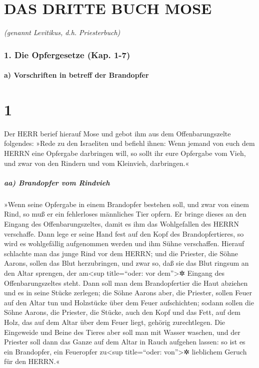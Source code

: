 \hypertarget{das-dritte-buch-mose}{%
\section{DAS DRITTE BUCH MOSE}\label{das-dritte-buch-mose}}

\emph{(genannt Levitikus, d.h. Priesterbuch)}

\hypertarget{die-opfergesetze-kap.-1-7}{%
\subsubsection{1. Die Opfergesetze (Kap.
1-7)}\label{die-opfergesetze-kap.-1-7}}

\hypertarget{a-vorschriften-in-betreff-der-brandopfer}{%
\paragraph{a) Vorschriften in betreff der
Brandopfer}\label{a-vorschriften-in-betreff-der-brandopfer}}

\hypertarget{section}{%
\section{1}\label{section}}

Der HERR berief hierauf Mose und gebot ihm aus dem
Offenbarungszelte folgendes: »Rede zu den Israeliten und
befiehl ihnen: Wenn jemand von euch dem HERRN eine Opfergabe darbringen
will, so sollt ihr eure Opfergabe vom Vieh, und zwar von den Rindern und
vom Kleinvieh, darbringen.«

\hypertarget{aa-brandopfer-vom-rindvieh}{%
\subparagraph{aa) Brandopfer vom
Rindvieh}\label{aa-brandopfer-vom-rindvieh}}

»Wenn seine Opfergabe in einem Brandopfer bestehen soll,
und zwar von einem Rind, so muß er ein fehlerloses männliches Tier
opfern. Er bringe dieses an den Eingang des Offenbarungszeltes, damit es
ihm das Wohlgefallen des HERRN verschaffe. Dann lege er
seine Hand fest auf den Kopf des Brandopfertieres, so wird es
wohlgefällig aufgenommen werden und ihm Sühne verschaffen.
Hierauf schlachte man das junge Rind vor dem HERRN; und
die Priester, die Söhne Aarons, sollen das Blut herzubringen, und zwar
so, daß sie das Blut ringsum an den Altar sprengen, der am\textless sup
title=``oder: vor dem''\textgreater✲ Eingang des Offenbarungszeltes
steht. Dann soll man dem Brandopfertier die Haut abziehen
und es in seine Stücke zerlegen; die Söhne Aarons aber,
die Priester, sollen Feuer auf den Altar tun und Holzstücke über dem
Feuer aufschichten; sodann sollen die Söhne Aarons, die
Priester, die Stücke, auch den Kopf und das Fett, auf dem Holz, das auf
dem Altar über dem Feuer liegt, gehörig zurechtlegen. Die
Eingeweide und Beine des Tieres aber soll man mit Wasser waschen, und
der Priester soll dann das Ganze auf dem Altar in Rauch aufgehen lassen:
so ist es ein Brandopfer, ein Feueropfer zu\textless sup title=``oder:
von''\textgreater✲ lieblichem Geruch für den HERRN.«

